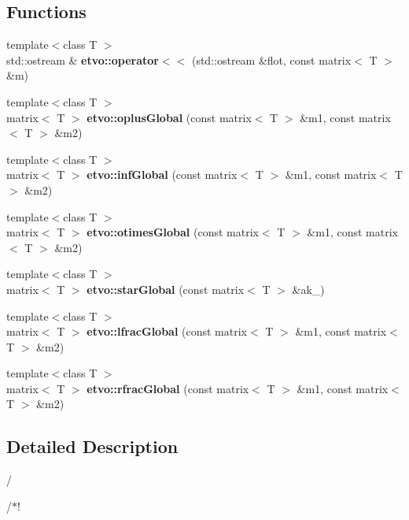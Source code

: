 \subsection*{Functions}
\begin{DoxyCompactItemize}
\item 
\mbox{\label{namespaceetvo_a652b5b2a2bff7bfced47a6d5d95f9324}} 
{\footnotesize template$<$class T $>$ }\\std\+::ostream \& {\bfseries etvo\+::operator$<$$<$} (std\+::ostream \&flot, const matrix$<$ T $>$ \&m)
\item 
\mbox{\label{namespaceetvo_a6b3f17c3a6d936020efc550bbdd8f35c}} 
{\footnotesize template$<$class T $>$ }\\matrix$<$ T $>$ {\bfseries etvo\+::oplus\+Global} (const matrix$<$ T $>$ \&m1, const matrix$<$ T $>$ \&m2)
\item 
\mbox{\label{namespaceetvo_a540b8250edb57ded2174ed86b4cfdb2e}} 
{\footnotesize template$<$class T $>$ }\\matrix$<$ T $>$ {\bfseries etvo\+::inf\+Global} (const matrix$<$ T $>$ \&m1, const matrix$<$ T $>$ \&m2)
\item 
\mbox{\label{namespaceetvo_ad65c997f8f8bf5106ea3cf036839cbaf}} 
{\footnotesize template$<$class T $>$ }\\matrix$<$ T $>$ {\bfseries etvo\+::otimes\+Global} (const matrix$<$ T $>$ \&m1, const matrix$<$ T $>$ \&m2)
\item 
\mbox{\label{namespaceetvo_a72ebd2f077452e3b78985a1ec069d8ce}} 
{\footnotesize template$<$class T $>$ }\\matrix$<$ T $>$ {\bfseries etvo\+::star\+Global} (const matrix$<$ T $>$ \&ak\+\_)
\item 
\mbox{\label{namespaceetvo_a4de06e817da273fead42394d2ed574f4}} 
{\footnotesize template$<$class T $>$ }\\matrix$<$ T $>$ {\bfseries etvo\+::lfrac\+Global} (const matrix$<$ T $>$ \&m1, const matrix$<$ T $>$ \&m2)
\item 
\mbox{\label{namespaceetvo_a67515592050e570dcb8464891675a24d}} 
{\footnotesize template$<$class T $>$ }\\matrix$<$ T $>$ {\bfseries etvo\+::rfrac\+Global} (const matrix$<$ T $>$ \&m1, const matrix$<$ T $>$ \&m2)
\end{DoxyCompactItemize}


\subsection{Detailed Description}
/

/$\ast$! 